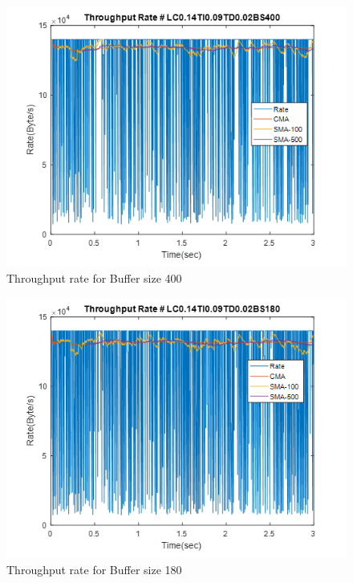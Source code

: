 \documentclass[a4paper]{article}
\begin{document}
\begin{figure}
\centering
\includegraphics[width=1\textwidth]{BS400.png}
\caption{\label{fig:BS400} Throughput rate for Buffer size 400}
\end{figure}

\begin{figure}
\centering
\includegraphics[width=1\textwidth]{BS180.png}
\caption{\label{fig:BS180}Throughput rate for Buffer size 180 }
\end{figure}
\end{document}
